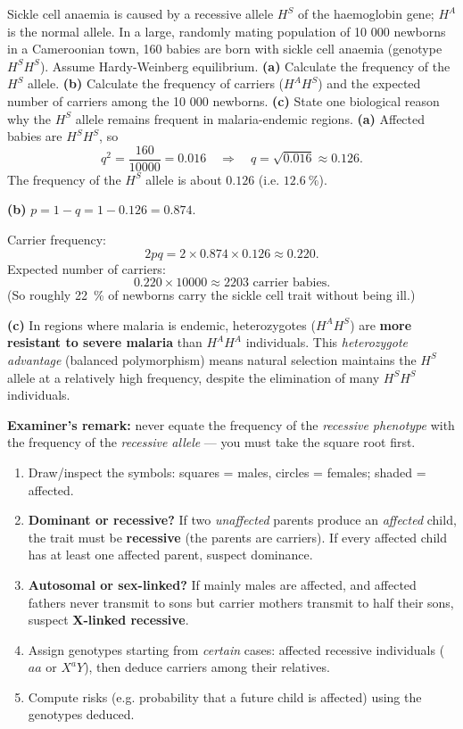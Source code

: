 \documentclass[11pt]{article}
\newcounter{popsec}
\newcounter{popsub}
\newcommand{\courssub}[1]{%
  \stepcounter{popsub}%
  \par\vspace{9pt}\noindent{\popxbold\fontsize{11.5}{13}\selectfont\color{popink}{\color{poporange}\thepopsec.\thepopsub}\hspace{6pt}#1}\par\nopagebreak\vspace{4pt}
}
\begin{document}
\begin{exoresolu}
Sickle cell anaemia is caused by a recessive allele $H^S$ of the haemoglobin gene; $H^A$ is the normal allele. In a large, randomly mating population of 10 000 newborns in a Cameroonian town, 160 babies are born with sickle cell anaemia (genotype $H^S H^S$). Assume Hardy-Weinberg equilibrium. \textbf{(a)} Calculate the frequency of the $H^S$ allele. \textbf{(b)} Calculate the frequency of carriers ($H^A H^S$) and the expected number of carriers among the 10 000 newborns. \textbf{(c)} State one biological reason why the $H^S$ allele remains frequent in malaria-endemic regions.
\tcblower
\textbf{(a)} Affected babies are $H^S H^S$, so
\[ q^2 = \frac{160}{10000} = 0.016 \quad\Rightarrow\quad q = \sqrt{0.016} \approx 0.126. \]
The frequency of the $H^S$ allele is about $0.126$ (i.e. $12.6\ \%$).\par
\textbf{(b)} $p = 1 - q = 1 - 0.126 = 0.874$.\par
Carrier frequency:
\[ 2pq = 2 \times 0.874 \times 0.126 \approx 0.220. \]
Expected number of carriers:
\[ 0.220 \times 10000 \approx 2203 \text{ carrier babies.} \]
(So roughly 22\ \% of newborns carry the sickle cell trait without being ill.)\par
\textbf{(c)} In regions where malaria is endemic, heterozygotes ($H^A H^S$) are \textbf{more resistant to severe malaria} than $H^A H^A$ individuals. This \emph{heterozygote advantage} (balanced polymorphism) means natural selection maintains the $H^S$ allele at a relatively high frequency, despite the elimination of many $H^S H^S$ individuals.\par
\textbf{Examiner's remark:} never equate the frequency of the \emph{recessive phenotype} with the frequency of the \emph{recessive allele} — you must take the square root first.
\end{exoresolu}

\courssub{Skill 8: Reading a Pedigree}

\begin{methode}
\begin{enumerate}
\item Draw/inspect the symbols: squares = males, circles = females; shaded = affected.
\item \textbf{Dominant or recessive?} If two \emph{unaffected} parents produce an \emph{affected} child, the trait must be \textbf{recessive} (the parents are carriers). If every affected child has at least one affected parent, suspect dominance.
\item \textbf{Autosomal or sex-linked?} If mainly males are affected, and affected fathers never transmit to sons but carrier mothers transmit to half their sons, suspect \textbf{X-linked recessive}.
\item Assign genotypes starting from \emph{certain} cases: affected recessive individuals ($aa$ or $X^a Y$), then deduce carriers among their relatives.
\item Compute risks (e.g. probability that a future child is affected) using the genotypes deduced.
\end{enumerate}
\end{methode}
\end{document}
